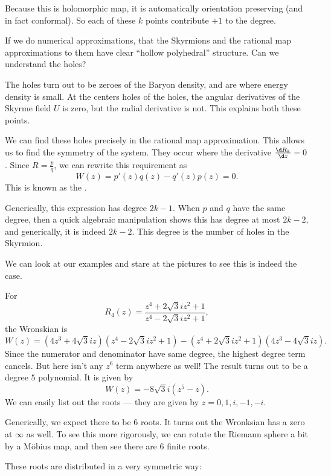 \documentclass[a4paper]{article}
\begin{document}
Because this is holomorphic map, it is automatically orientation preserving (and in fact conformal). So each of these $k$ points contribute $+1$ to the degree.

If we do numerical approximations, that the Skyrmions and the rational map approximations to them have clear ``hollow polyhedral'' structure. Can we understand the holes?

The holes turn out to be zeroes of the Baryon density, and are where energy density is small. At the centers holes of the holes, the angular derivatives of the Skyrme field $U$ is zero, but the radial derivative is not. This explains both these points. %

We can find these holes precisely in the rational map approximation. This allows us to find the symmetry of the system. They occur where the derivative $\frac{\d R_k}{\d z} = 0$. Since $R = \frac{p}{q}$, we can rewrite this requirement as
\[
  W(z) = p'(z) q(z) - q'(z) p(z) = 0.
\]
This is known as the .

Generically, this expression has degree $2k - 1$. When $p$ and $q$ have the same degree, then a quick algebraic manipulation shows this has degree at most $2k - 2$, and generically, it is indeed $2k - 2$. This degree is the number of holes in the Skyrmion.

We can look at our examples and stare at the pictures to see this is indeed the case. %

\begin{eg}
  For
  \[
    R_4(z) = \frac{z^4 + 2\sqrt{3} i z^2 + 1}{z^4 - 2\sqrt{3} i z^2 + 1},
  \]
  the Wronskian is
  \[
    W(z) = (4z^3 + 4 \sqrt{3}i z)(z^4 - 2\sqrt{3} i z^2 + 1) - (z^4 + 2 \sqrt{3} i z^2 + 1) (4z^3 - 4 \sqrt{3} i z).
  \]
  Since the numerator and denominator have same degree, the highest degree term cancels. But here isn't any $z^6$ term anywhere as well! The result turns out to be a degree $5$ polynomial. It is given by
  \[
    W(z) = - 8 \sqrt{3}i (z^5 - z).
  \]
  We can easily list out the roots --- they are given by $z = 0, 1, i, -1, -i$.

  Generically, we expect there to be $6$ roots. It turns out the Wronksian has a zero at $\infty$ as well. To see this more rigorously, we can rotate the Riemann sphere a bit by a M\"obius map, and then see there are $6$ finite roots.

  These roots are distributed in a very symmetric way:

\end{eg}
\end{document}
